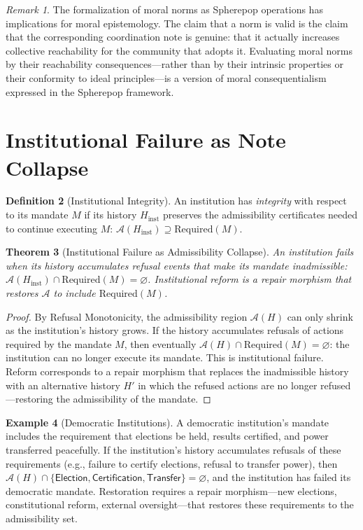 \documentclass[12pt, a4paper, openany]{book}
\theoremstyle{plain}
\newtheorem{theorem}{Theorem}[chapter]
\theoremstyle{definition}
\newtheorem{definition}[theorem]{Definition}
\newtheorem{example}[theorem]{Example}
\theoremstyle{remark}
\newtheorem{remark}[theorem]{Remark}
\newcommand{\calA}{\mathcal{A}}
\begin{document}
\begin{remark}
The formalization of moral norms as Spherepop operations has implications for
moral epistemology. The claim that a norm is valid is the claim that the
corresponding coordination note is genuine: that it actually increases collective
reachability for the community that adopts it. Evaluating moral norms by their
reachability consequences---rather than by their intrinsic properties or their
conformity to ideal principles---is a version of moral consequentialism expressed
in the Spherepop framework.
\end{remark}

\section{Institutional Failure as Note Collapse}

\begin{definition}[Institutional Integrity]
An institution has \emph{integrity} with respect to its mandate $M$ if its
history $H_{\mathrm{inst}}$ preserves the admissibility certificates needed
to continue executing $M$: $\calA(H_{\mathrm{inst}}) \supseteq
\mathrm{Required}(M)$.
\end{definition}

\begin{theorem}[Institutional Failure as Admissibility Collapse]
An institution fails when its history accumulates refusal events that make
its mandate inadmissible: $\calA(H_{\mathrm{inst}}) \cap \mathrm{Required}(M)
= \varnothing$. Institutional reform is a repair morphism that restores
$\calA$ to include $\mathrm{Required}(M)$.
\end{theorem}

\begin{proof}
By Refusal Monotonicity, the admissibility region $\calA(H)$ can only shrink
as the institution's history grows. If the history accumulates refusals of
actions required by the mandate $M$, then eventually $\calA(H) \cap
\mathrm{Required}(M) = \varnothing$: the institution can no longer execute
its mandate. This is institutional failure. Reform corresponds to a repair
morphism that replaces the inadmissible history with an alternative history
$H'$ in which the refused actions are no longer refused---restoring the
admissibility of the mandate.
\end{proof}

\begin{example}[Democratic Institutions]
A democratic institution's mandate includes the requirement that elections be
held, results certified, and power transferred peacefully. If the institution's
history accumulates refusals of these requirements (e.g., failure to certify
elections, refusal to transfer power), then $\calA(H) \cap \{\mathsf{Election},
\mathsf{Certification}, \mathsf{Transfer}\} = \varnothing$, and the institution
has failed its democratic mandate. Restoration requires a repair morphism---new
elections, constitutional reform, external oversight---that restores these
requirements to the admissibility set.
\end{example}
\end{document}
